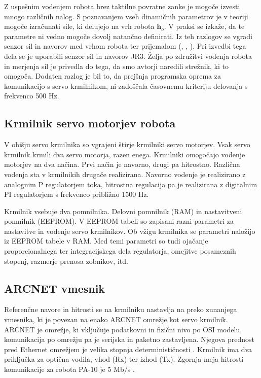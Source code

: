 \documentclass[a4paper]{article}
\begin{document}
Z uspešnim vodenjem robota brez taktilne povratne zanke je mogoče izvesti mnogo različnih nalog. S poznavanjem vseh dinamičnih parametrov je v teoriji mogoče izračunati sile, ki delujejo na vrh robota $\textbf{h}_o$. V praksi se izkaže, da te parametre ni vedno mogoče dovolj natančno definirati. Iz teh razlogov se vgradi senzor sil in navorov med vrhom robota ter prijemalom (\cite{almassri_pressure_sensor}, \cite{mihelj_vodenje}, \cite{eppinger_force_dynamics}). Pri izvedbi tega dela se je uporabili senzor sil in navorov JR3. Želja po združitvi vodenja robota in merjenja sil je privedla do tega, da smo avtorji naredili  strežnik, ki to omogoča. Dodaten razlog je bil to, da prejšnja programska oprema za komunikacijo s servo krmilnikom, ni zadoščala časovnemu kriteriju delovanja s frekvenco 500 Hz.

\subsection{Krmilnik servo motorjev robota} \label{sec:servo-drive}

V ohišju servo krmilnika so vgrajeni štirje krmilniki servo motorjev. Vsak servo krmilnik krmili dva servo motorja, razen enega. Krmilniki omogočajo vodenje motorjev na dva načina. Prvi način je navorno, drugi pa hitrostno. Različna vodenja sta v krmilnikih drugače realizirana. Navorno vodenje je realizirano z analognim P regulatorjem toka, hitrostna regulacija pa je realizirana z digitalnim PI regulatorjem s frekvenco približno 1500 Hz.

Krmilnik vsebuje dva pomnilnika. Delovni pomnilnik (RAM) in nastavitveni pomnilnik (EEPROM). V EEPROM tabeli so zapisani razni parametri za nastavitve in vodenje servo krmilnikov. Ob vžigu krmilnika se parametri naložijo iz EEPROM tabele v RAM. Med temi parametri so tudi ojačanje proporcionalnega ter integracijskega dela regulatorja, omejitve posameznih stopenj, razmerje prenosa zobnikov, itd.

\subsection{ARCNET vmesnik}\label{sec:arc_drive}

Referenčne navore in hitrosti se na krmilniku nastavlja na preko zunanjega vmesnika, ki je povezan na enako ARCNET omrežje kot servo krmilnik. ARCNET je omrežje, ki vključuje podatkovni in fizični nivo po OSI modelu, komunikacija po omrežju pa je serijska in paketno zastavljena. Njegova prednost pred Ethernet omrežjem je velika stopnja determinističnosti \cite{arc_tutorial}. Krmilnik ima dva priključka za optična 
vodila, vhod (Rx) ter izhod (Tx). Zgornja meja hitrosti komunikacije za robota PA-10 je 5 Mb/s \cite{pa10-manual}.
\end{document}
